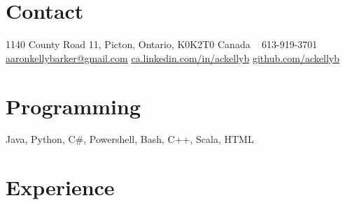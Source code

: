 \documentclass[]{friggeri-cv} %
\begin{document}



\begin{aside} %
	\section{Contact}
	1140 County Road 11, 
	Picton, Ontario,
	K0K2T0 Canada
	~
	613-919-3701
	~
	\href{mailto:aaron.kelly.barker@gmail.com}{aaronkellybarker@gmail.com}
	\href{ca.linkedin.com/in/ackellyb/}{ca.linkedin.com/in/ackellyb}
	\href{https://github.com/ackellyb}{github.com/ackellyb}
	\section{Programming}
	Java, Python, C\#,
	Powershell, Bash, 
	C++, Scala, HTML
\end{aside}


\section{Experience}
\end{document}
